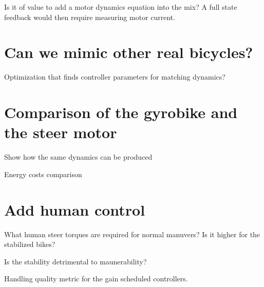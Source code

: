 \documentclass[12pt]{article}
\begin{document}
Is it of value to add a motor dynamics equation into the mix? A full state
feedback would then require measuring motor current.

\section{Can we mimic other real bicycles?}

Optimization that finds controller parameters for matching dynamics?

\section{Comparison of the gyrobike and the steer motor}

Show how the same dynamics can be produced

Energy costs comparison

\section{Add human control}

What human steer torques are required for normal manuvers? Is it higher for the
stabilized bikes?

Is the stability detrimental to maunerability?

Handling quality metric for the gain scheduled controllers.
\end{document}
